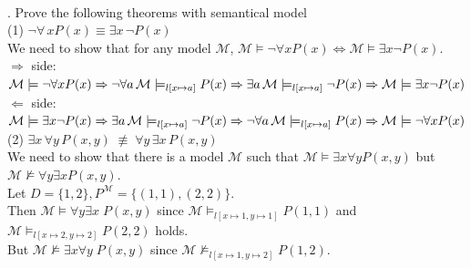\documentclass{article}
\begin{document}
~\\[1em]
. Prove the following theorems with semantical model
\\[1em]
(1) $\neg \forall\,x P(x) \equiv \exists x\,\neg P(x)$
\\[1em]
We need to show that for any model $\mathcal M$, $\mathcal M \models \neg \forall x P(x) \iff \mathcal M \models \exists x \neg P(x)$.\\
$\Rightarrow$ side:\\
$\mathcal M \models \neg \forall x P(x)\\
\Rightarrow \neg \forall a\, \mathcal M \models_{l[x \mapsto a]} P(x)\\
\Rightarrow \exists a\, \mathcal M \models_{l[x \mapsto a]} \neg P(x)\\
\Rightarrow \mathcal M \models \exists x \neg P(x)\\
$
$\Leftarrow$ side:\\
$\mathcal M \models \exists x \neg P(x)\\
\Rightarrow \exists a\, \mathcal M \models_{l[x \mapsto a]} \neg P(x)\\
\Rightarrow \neg \forall a\, \mathcal M \models_{l[x \mapsto a]} P(x)\\
\Rightarrow \mathcal M \models \neg \forall x P(x)\\
$
\\[1em]
(2) $\exists x \,\forall y\, P(x,y) \;\not\equiv\; \forall y \,\exists x\, P(x,y)$
\\[1em]
We need to show that there is a model $\mathcal M$ such that $\mathcal M \models \exists x \forall y P(x,y)$ but $\mathcal M \not\models \forall y \exists x P(x,y)$.\\
Let $D = \{1,2\}, P^{\mathcal M}= \{(1,1), (2,2)\}$.\\
Then $\mathcal M \models \forall y\exists x\;P(x,y)$ since $\mathcal M \models_{l[x \mapsto 1, y \mapsto 1]} P(1, 1)$ and $\mathcal M \models_{l[x \mapsto 2, y \mapsto 2]} P(2, 2)$ holds.\\
But $\mathcal M \not\models \exists x\forall y\;P(x,y)$ since $\mathcal M \not\models_{l[x \mapsto 1, y \mapsto 2]} P(1, 2)$.\\
\end{document}
